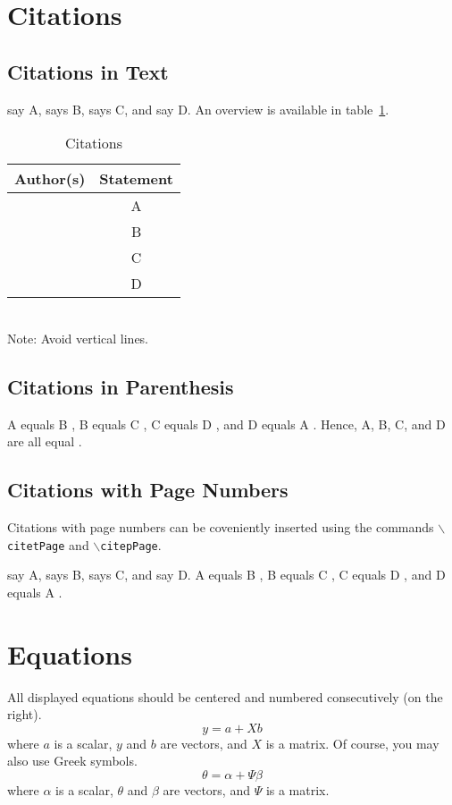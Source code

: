 \documentclass{erae}
\begin{document}
\section{Citations}
\subsection{Citations in Text}
\citet{Monier98} say A, \citet{Steenkamp97} says B,
\citet{Swinnen97} says C, and \citet{Zeller97} say D.
An overview is available in table~\ref{tab:citations}.

\begin{table}[htbp]
\caption{Citations}
\label{tab:citations}
\begin{tabular}{lc}
\hline
Author(s) & Statement\\
\hline
\citet{Monier98} & A\\
\citet{Steenkamp97} & B\\
\citet{Swinnen97} & C\\
\citet{Zeller97} & D\\
\hline
\end{tabular}
\medskip \\
Note: Avoid vertical lines.
\end{table}


\subsection{Citations in Parenthesis}
A equals B \citep{Monier98}, B equals C \citep{Steenkamp97},
C equals D \citep{Swinnen97}, and D equals A \citep{Zeller97}.
Hence, A, B, C, and D are all equal
\citep{Monier98, Steenkamp97, Swinnen97, Zeller97}.

\subsection{Citations with Page Numbers}
Citations with page numbers can be coveniently inserted using the commands
\texttt{$\backslash$citetPage} and \texttt{$\backslash$citepPage}.

 say A,  says B,
 says C, and  say D.
A equals B , B equals C ,
C equals D , and D equals A .


\section{Equations}
All displayed equations should be centered
and numbered consecutively (on the right).
\begin{equation}
y = a + X b
\end{equation}
where $a$ is a scalar,
$y$ and $b$ are vectors,
and $X$ is a matrix.
Of course, you may also use Greek symbols.
\begin{equation}
\theta = \alpha + \Psi \beta
\end{equation}
where $\alpha$ is a scalar,
$\theta$ and $\beta$ are vectors,
and $\Psi$ is a matrix.

\clearpage
\nocite{*}



\end{document}
